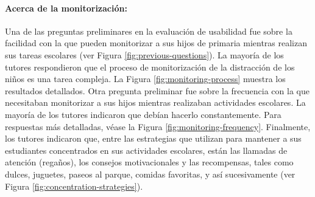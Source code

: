 \documentclass[a4paper,fleqn]{cas-sc}
\begin{document}
				\paragraph{\textbf{Acerca de la monitorización:}}
				Una de las preguntas preliminares en la evaluación de usabilidad fue sobre la facilidad con la que pueden monitorizar a sus hijos de primaria mientras realizan sus tareas escolares (ver Figura \ref{fig:previous-questions}). La mayoría de los tutores respondieron que el proceso de monitorización de la distracción de los niños es una tarea compleja. La Figura \ref{fig:monitoring-process} muestra los resultados detallados. Otra pregunta preliminar fue sobre la frecuencia con la que necesitaban monitorizar a sus hijos mientras realizaban actividades escolares. La mayoría de los tutores indicaron que debían hacerlo constantemente. Para respuestas más detalladas, véase la Figura \ref{fig:monitoring-frequency}. Finalmente, los tutores indicaron que, entre las estrategias que utilizan para mantener a sus estudiantes concentrados en sus actividades escolares, están las llamadas de atención (regaños), los consejos motivacionales y las recompensas, tales como dulces, juguetes, paseos al parque, comidas favoritas, y así sucesivamente (ver Figura \ref{fig:concentration-strategies}).
				
\end{document}
